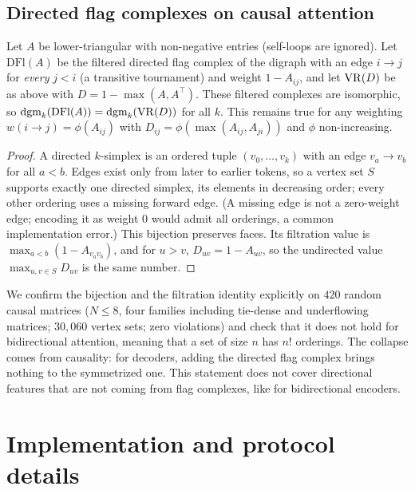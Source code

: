 \subsection{Directed flag complexes on causal attention}
\label{app:directed}
\begin{proposition}
\label{thm:directed}
Let $A$ be lower-triangular with non-negative entries (self-loops are ignored). Let $\mathrm{DFl}(A)$ be the filtered directed flag complex \citep{flagser2020} of the digraph with an edge $i\to j$ for \emph{every} $j<i$ (a transitive tournament) and weight $1-A_{ij}$, and let $\mathrm{VR}(D)$ be as above with $D=1-\max(A,A^\top)$. These filtered complexes are isomorphic, so $\mathrm{dgm}_k(\mathrm{DFl}(A))=\mathrm{dgm}_k(\mathrm{VR}(D))$ for all $k$. This remains true for any weighting $w(i\to j)=\phi(A_{ij})$ with $D_{ij}=\phi(\max(A_{ij},A_{ji}))$ and $\phi$ non-increasing.
\end{proposition}
\begin{proof}
A directed $k$-simplex is an ordered tuple $(v_0,\dots,v_k)$ with an edge $v_a\to v_b$ for all $a<b$. Edges exist only from later to earlier tokens, so a vertex set $S$ supports exactly one directed simplex, its elements in decreasing order; every other ordering uses a missing forward edge. (A missing edge is not a zero-weight edge; encoding it as weight $0$ would admit all orderings, a common implementation error.) This bijection preserves faces. Its filtration value is $\max_{a<b}(1-A_{v_av_b})$, and for $u>v$, $D_{uv}=1-A_{uv}$, so the undirected value $\max_{u,v\in S}D_{uv}$ is the same number.
\end{proof}
We confirm the bijection and the filtration identity explicitly on $420$ random causal matrices ($N\le8$, four families including tie-dense and underflowing matrices; $30{,}060$ vertex sets; zero violations) and check that it does not hold for bidirectional attention, meaning that a set of size $n$ has $n!$ orderings. The collapse comes from causality: for decoders, adding the directed flag complex brings nothing to the symmetrized one. This statement does not cover directional features that are not coming from flag complexes, like \citet{kushnareva2021} for bidirectional encoders.

\section{Implementation and protocol details}
\label{app:impl}

